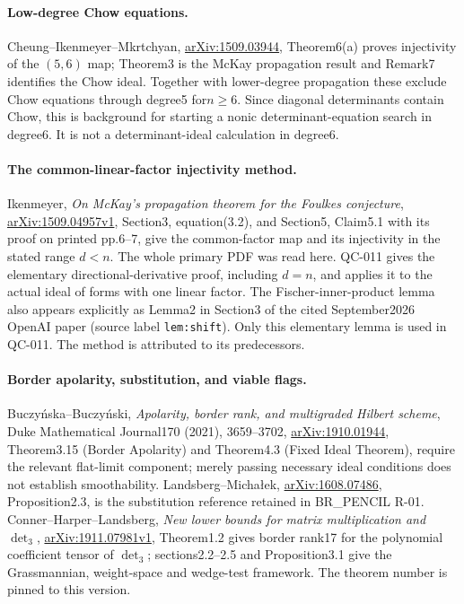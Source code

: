 \paragraph{Low-degree Chow equations.}
Cheung--Ikenmeyer--Mkrtchyan,
\href{https://arxiv.org/abs/1509.03944}{arXiv:1509.03944},
Theorem6(a) proves injectivity of the $(5,6)$ map; Theorem3 is the
McKay propagation result and Remark7 identifies the Chow ideal.
Together with lower-degree propagation these exclude Chow equations
through degree5 for$n\ge6$. Since diagonal determinants contain Chow,
this is background for starting a nonic determinant-equation search
in degree6. It is not a determinant-ideal calculation in degree6.

\paragraph{The common-linear-factor injectivity method.}
Ikenmeyer, \emph{On McKay's propagation theorem for the Foulkes
conjecture}, \href{https://arxiv.org/pdf/1509.04957}{arXiv:1509.04957v1},
Section3, equation(3.2), and Section5, Claim5.1 with its proof on
printed pp.6--7, give the common-factor map and its injectivity in
the stated range $d<n$. The whole primary PDF was read here.
QC-011 gives the elementary directional-derivative proof, including
$d=n$, and applies it to the actual ideal of forms with one linear
factor. The Fischer-inner-product lemma also appears explicitly as
Lemma2 in Section3 of the cited September2026 OpenAI paper
(source label \texttt{lem:shift}). Only this elementary lemma is
used in QC-011. The method is attributed to its predecessors.

\paragraph{Border apolarity, substitution, and viable flags.}
Buczy\'nska--Buczy\'nski, \emph{Apolarity, border rank, and
multigraded Hilbert scheme}, Duke Mathematical Journal170 (2021),
3659--3702, \href{https://arxiv.org/abs/1910.01944}{arXiv:1910.01944},
Theorem3.15 (Border Apolarity) and Theorem4.3 (Fixed Ideal Theorem),
require the relevant flat-limit component; merely passing necessary
ideal conditions does not establish smoothability.
Landsberg--Micha\l ek,
\href{https://arxiv.org/abs/1608.07486}{arXiv:1608.07486},
Proposition2.3, is the substitution reference retained in BR\_PENCIL R-01.
Conner--Harper--Landsberg, \emph{New lower bounds for matrix
multiplication and $\det_3$},
\href{https://arxiv.org/abs/1911.07981v1}{arXiv:1911.07981v1},
Theorem1.2 gives border rank17 for the polynomial coefficient tensor
of $\det_3$; sections2.2--2.5 and Proposition3.1 give the Grassmannian,
weight-space and wedge-test framework. The theorem number is pinned
to this version.

